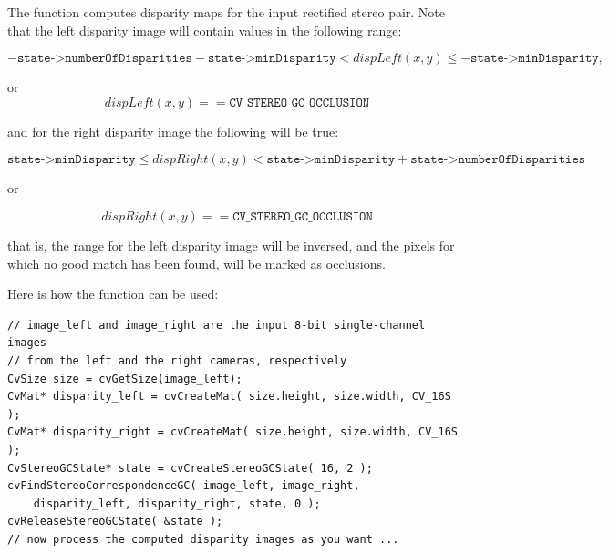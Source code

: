 \begin{description}
\end{description}

The function computes disparity maps for the input rectified stereo pair. Note that the left disparity image will contain values in the following range:

\[
-\texttt{state->numberOfDisparities}-\texttt{state->minDisparity}
< dispLeft(x,y) \le -\texttt{state->minDisparity},
\]

or
\[
dispLeft(x,y) == \texttt{CV\_STEREO\_GC\_OCCLUSION}
\]

and for the right disparity image the following will be true:

\[
\texttt{state->minDisparity} \le dispRight(x,y)
< \texttt{state->minDisparity} + \texttt{state->numberOfDisparities}
\]

or

\[
dispRight(x,y) == \texttt{CV\_STEREO\_GC\_OCCLUSION}
\]

that is, the range for the left disparity image will be inversed,
and the pixels for which no good match has been found, will be marked
as occlusions.

Here is how the function can be used:

\ifC
\begin{lstlisting}
// image_left and image_right are the input 8-bit single-channel images
// from the left and the right cameras, respectively
CvSize size = cvGetSize(image_left);
CvMat* disparity_left = cvCreateMat( size.height, size.width, CV_16S );
CvMat* disparity_right = cvCreateMat( size.height, size.width, CV_16S );
CvStereoGCState* state = cvCreateStereoGCState( 16, 2 );
cvFindStereoCorrespondenceGC( image_left, image_right,
    disparity_left, disparity_right, state, 0 );
cvReleaseStereoGCState( &state );
// now process the computed disparity images as you want ...
\end{lstlisting}

